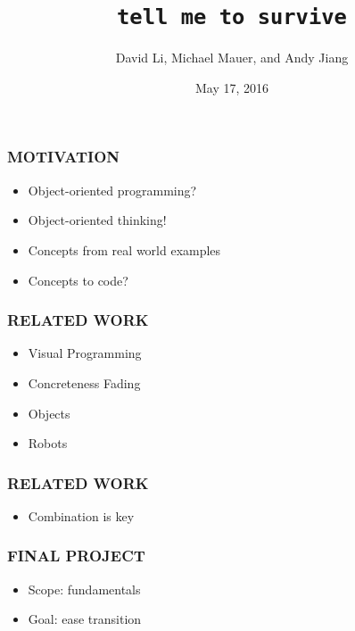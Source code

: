 \documentclass{beamer}
\title{\texttt{tell me to survive}}
\author{David Li, Michael Mauer, and Andy Jiang}
\institute{Cornell University}
\date{May 17, 2016}
\let\theframetitle\frametitle
\renewcommand\frametitle[1]{\theframetitle{\MakeUppercase{#1}}}
\begin{document}
\frame{\titlepage}

\begin{frame}
\frametitle{Motivation}


\begin{itemize}[<+->]
\item Object-oriented programming?
\item Object-oriented thinking!
\item Concepts from real world examples
\item Concepts to code?
\end{itemize}
\end{frame}

\begin{frame}
\frametitle{Related Work}
\begin{itemize}[<+->]
\item Visual Programming
\item Concreteness Fading
\item Objects
\item Robots
\end{itemize}
\end{frame}

\begin{frame}
\frametitle{Related Work}
\begin{itemize}[<+->]
\item Combination is key
\end{itemize}
\end{frame}

\begin{frame}
\frametitle{Final Project}
\begin{itemize}[<+->]
\item Scope: fundamentals
\item Goal: ease transition
\end{itemize}
\end{frame}
\end{document}
